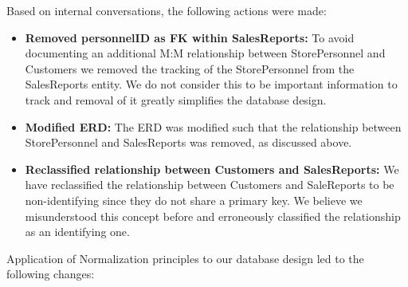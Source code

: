\documentclass{article}
\begin{document}
\begin{tcolorbox}[colback=secondarycolor, colframe=primarycolor, arc=5mm, title=\textbf{Step 1 --> Step 2}]
Based on internal conversations, the following actions were made:
\vspace{0.2cm}
\begin{itemize}
  \item \textbf{Removed personnelID as FK within SalesReports:} To avoid documenting an additional M:M relationship between StorePersonnel and Customers we removed the tracking of the StorePersonnel from the SalesReports entity. We do not consider this to be important information to track and removal of it greatly simplifies the database design.
  \vspace{0.1cm}
  \item \textbf{Modified ERD:} The ERD was modified such that the relationship between StorePersonnel and SalesReports was removed, as discussed above.
  \vspace{0.1cm}
  \item \textbf{Reclassified relationship between Customers and SalesReports:} We have reclassified the relationship between Customers and SaleReports to be non-identifying since they do not share a primary key. We believe we misunderstood this concept before and erroneously classified the relationship as an identifying one.
  \end{itemize}
\vspace{0.2cm}

Application of Normalization principles to our database design led to the following changes:


\end{tcolorbox}
\end{document}
